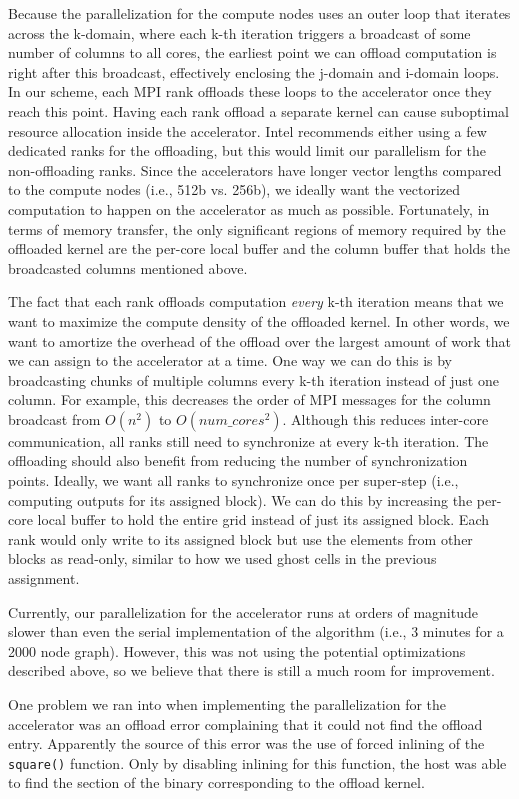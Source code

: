 Because the parallelization for the compute nodes uses an outer loop that
iterates across the k-domain, where each k-th iteration triggers a
broadcast of some number of columns to all cores, the earliest point we
can offload computation is right after this broadcast, effectively
enclosing the j-domain and i-domain loops. In our scheme, each MPI rank
offloads these loops to the accelerator once they reach this
point. Having each rank offload a separate kernel can cause suboptimal
resource allocation inside the accelerator. Intel recommends either using
a few dedicated ranks for the offloading, but this would limit our
parallelism for the non-offloading ranks. Since the accelerators have
longer vector lengths compared to the compute nodes (i.e., 512b
vs. 256b), we ideally want the vectorized computation to happen on the
accelerator as much as possible. Fortunately, in terms of memory
transfer, the only significant regions of memory required by the
offloaded kernel are the per-core local buffer and the column buffer that
holds the broadcasted columns mentioned above.

The fact that each rank offloads computation \emph{every} k-th iteration
means that we want to maximize the compute density of the offloaded
kernel. In other words, we want to amortize the overhead of the offload
over the largest amount of work that we can assign to the accelerator at
a time. One way we can do this is by broadcasting chunks of multiple
columns every k-th iteration instead of just one column. For example,
this decreases the order of MPI messages for the column broadcast from
$O(n^2)$ to $O(num\_cores^2)$. Although this reduces inter-core
communication, all ranks still need to synchronize at every k-th
iteration. The offloading should also benefit from reducing the number of
synchronization points. Ideally, we want all ranks to synchronize once
per super-step (i.e., computing outputs for its assigned block). We can
do this by increasing the per-core local buffer to hold the entire grid
instead of just its assigned block. Each rank would only write to its
assigned block but use the elements from other blocks as read-only,
similar to how we used ghost cells in the previous assignment.

Currently, our parallelization for the accelerator runs at orders of
magnitude slower than even the serial implementation of the algorithm
(i.e., 3 minutes for a 2000 node graph). However, this was not using the
potential optimizations described above, so we believe that there is
still a much room for improvement.

One problem we ran into when implementing the parallelization for the
accelerator was an offload error complaining that it could not find the
offload entry. Apparently the source of this error was the use of forced
inlining of the \texttt{square()} function. Only by disabling inlining
for this function, the host was able to find the section of the binary
corresponding to the offload kernel.
